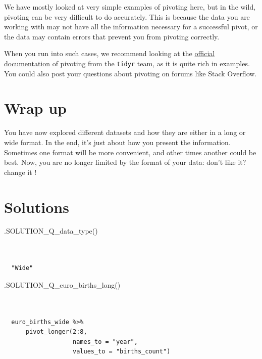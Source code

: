 \documentclass[
  letterpaper,
  DIV=11,
  numbers=noendperiod]{scrreprt}
\newenvironment{Shaded}{\begin{snugshade}}{\end{snugshade}}
\newcommand{\FunctionTok}[1]{\textcolor[rgb]{0.28,0.35,0.67}{#1}}
\newcommand{\NormalTok}[1]{\textcolor[rgb]{0.00,0.23,0.31}{#1}}
\begin{document}
We have mostly looked at very simple examples of pivoting here, but in
the wild, pivoting can be very difficult to do accurately. This is
because the data you are working with may not have all the information
necessary for a successful pivot, or the data may contain errors that
prevent you from pivoting correctly.

When you run into such cases, we recommend looking at the
\href{https://tidyr.tidyverse.org/articles/pivot.html}{official
documentation} of pivoting from the \texttt{tidyr} team, as it is quite
rich in examples. You could also post your questions about pivoting on
forums like Stack Overflow.

\hypertarget{wrap-up-9}{%
\section{Wrap up}\label{wrap-up-9}}

You have now explored different datasets and how they are either in a
long or wide format. In the end, it's just about how you present the
information. Sometimes one format will be more convenient, and other
times another could be best. Now, you are no longer limited by the
format of your data: don't like it? change it !

\hypertarget{solutions-7}{%
\section{Solutions}\label{solutions-7}}

\begin{Shaded}
\begin{Highlighting}[]
\FunctionTok{.SOLUTION\_Q\_data\_type}\NormalTok{()}
\end{Highlighting}
\end{Shaded}

\begin{verbatim}


  "Wide"
\end{verbatim}

\begin{Shaded}
\begin{Highlighting}[]
\FunctionTok{.SOLUTION\_Q\_euro\_births\_long}\NormalTok{()}
\end{Highlighting}
\end{Shaded}

\begin{verbatim}


  euro_births_wide %>% 
      pivot_longer(2:8, 
                   names_to = "year", 
                   values_to = "births_count")
\end{verbatim}
\end{document}
